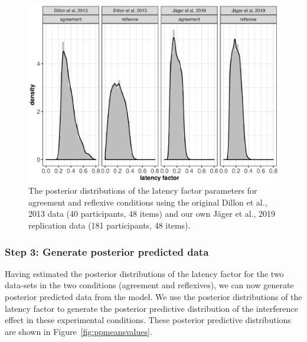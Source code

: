 \documentclass{cambridge7A}\usepackage[]{graphicx}\usepackage[]{color}
\makeatletter
\def\maxwidth{ %
  \ifdim\Gin@nat@width>\linewidth
    \linewidth
  \else
    \Gin@nat@width
  \fi
}
\newenvironment{knitrout}{}{} %
\makeatother
\begin{document}
\begin{figure}[!htbp]
\centering
\begin{knitrout}
\color{fgcolor}

{\centering \includegraphics[width=\maxwidth]{figures/fig-plotlf-1} 

}



\end{knitrout}
\caption{The posterior distributions of the latency factor parameters for agreement and reflexive conditions using the original Dillon et al., 2013 data (40 participants, 48 items) and our own Jäger et al., 2019 replication data (181 participants, 48 items).}\label{fig:lfvalues}
\end{figure}

\subsubsection{Step 3: Generate posterior predicted data}

Having estimated the posterior distributions of the latency factor for the two data-sets in the two conditions (agreement and reflexives), we can now  generate posterior predicted data from the model. We use the posterior distributions of the latency factor to generate the posterior predictive distribution of the interference effect in these experimental conditions.
These posterior predictive distributions are shown in Figure~\ref{fig:ppmeansvalues}. 
\end{document}
